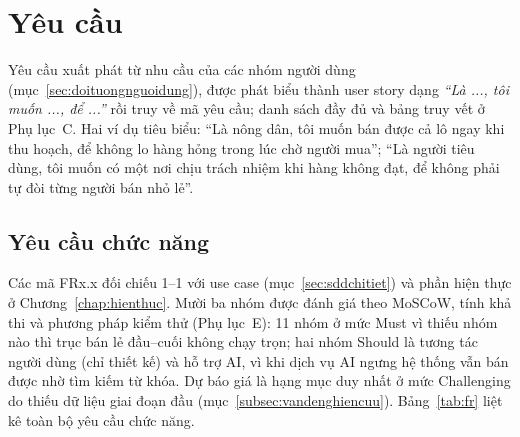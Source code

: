 \section{Yêu cầu}
\label{sec:yeucau}

Yêu cầu xuất phát từ nhu cầu của các nhóm người dùng (mục~\ref{sec:doituongnguoidung}), được phát biểu thành user story dạng \emph{``Là ..., tôi muốn ..., để ...''} rồi truy về mã yêu cầu; danh sách đầy đủ và bảng truy vết ở Phụ lục~C. Hai ví dụ tiêu biểu: ``Là nông dân, tôi muốn bán được cả lô ngay khi thu hoạch, để không lo hàng hỏng trong lúc chờ người mua''; ``Là người tiêu dùng, tôi muốn có một nơi chịu trách nhiệm khi hàng không đạt, để không phải tự đòi từng người bán nhỏ lẻ''.

\subsection{Yêu cầu chức năng}
\label{sec:yeucauchucnang}

Các mã FRx.x đối chiếu 1--1 với use case (mục~\ref{sec:sddchitiet}) và phần hiện thực ở Chương~\ref{chap:hienthuc}. Mười ba nhóm được đánh giá theo MoSCoW, tính khả thi và phương pháp kiểm thử (Phụ lục~E): 11 nhóm ở mức Must vì thiếu nhóm nào thì trục bán lẻ đầu--cuối không chạy trọn; hai nhóm Should là tương tác người dùng (chỉ thiết kế) và hỗ trợ AI, vì khi dịch vụ AI ngưng hệ thống vẫn bán được nhờ tìm kiếm từ khóa. Dự báo giá là hạng mục duy nhất ở mức Challenging do thiếu dữ liệu giai đoạn đầu (mục~\ref{subsec:vandenghiencuu}). Bảng~\ref{tab:fr} liệt kê toàn bộ yêu cầu chức năng.

